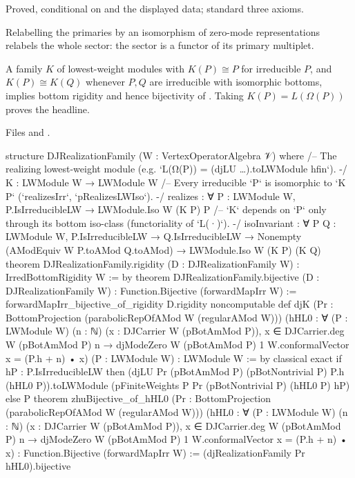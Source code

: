 \begin{status}
Proved, conditional on  and the displayed data; standard three axioms.
\end{status}

\begin{physics}
Relabelling the primaries by an isomorphism of zero-mode representations relabels the whole sector: the sector is a functor of its
primary multiplet.
\end{physics}

\begin{theorem}[Assembly]\label{l13:thm:assembly}
A family $K$ of lowest-weight modules with $K(P)\cong P$ for irreducible $P$, and $K(P)\cong K(Q)$ whenever $P,Q$ are irreducible with
isomorphic bottoms, implies bottom rigidity and hence bijectivity of . Taking $K(P) = L(\Omega(P))$ proves the
headline.
\end{theorem}
\noindent Files  and
.
\begin{leancode}
structure DJRealizationFamily (W : VertexOperatorAlgebra 𝒱) where
  /-- The realizing lowest-weight module (e.g. `L(Ω(P)) = (djLU …).toLWModule hfin`). -/
  K : LWModule W → LWModule W
  /-- Every irreducible `P` is isomorphic to `K P` (`realizesIrr`, `pRealizesLWIso`). -/
  realizes : ∀ P : LWModule W, P.IsIrreducibleLW → LWModule.Iso W (K P) P
  /-- `K` depends on `P` only through its bottom iso-class (functoriality of `L(·)`). -/
  isoInvariant : ∀ P Q : LWModule W, P.IsIrreducibleLW → Q.IsIrreducibleLW →
    Nonempty (AModEquiv W P.toAMod Q.toAMod) → LWModule.Iso W (K P) (K Q)
theorem DJRealizationFamily.rigidity (D : DJRealizationFamily W) : IrredBottomRigidity W := by
theorem DJRealizationFamily.bijective (D : DJRealizationFamily W) :
    Function.Bijective (forwardMapIrr W) :=
  forwardMapIrr_bijective_of_rigidity D.rigidity
noncomputable def djK (Pr : BottomProjection (parabolicRepOfAMod W (regularAMod W)))
    (hHL0 : ∀ (P : LWModule W) (n : ℕ) (x : DJCarrier W (pBotAmMod P)),
      x ∈ DJCarrier.deg W (pBotAmMod P) n →
      djModeZero W (pBotAmMod P) 1 W.conformalVector x = (P.h + n) • x)
    (P : LWModule W) : LWModule W := by
  classical
  exact if hP : P.IsIrreducibleLW then
    (djLU Pr (pBotAmMod P) (pBotNontrivial P) P.h (hHL0 P)).toLWModule
      (pFiniteWeights P Pr (pBotNontrivial P) (hHL0 P) hP)
  else P
theorem zhuBijective_of_hHL0
    (Pr : BottomProjection (parabolicRepOfAMod W (regularAMod W)))
    (hHL0 : ∀ (P : LWModule W) (n : ℕ) (x : DJCarrier W (pBotAmMod P)),
      x ∈ DJCarrier.deg W (pBotAmMod P) n →
      djModeZero W (pBotAmMod P) 1 W.conformalVector x = (P.h + n) • x) :
    Function.Bijective (forwardMapIrr W) :=
  (djRealizationFamily Pr hHL0).bijective
\end{leancode}

